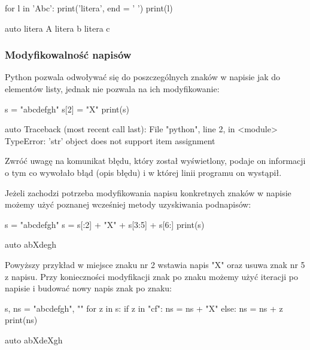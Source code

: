 \documentclass{pdfBooklets}
\begin{document}
\begin{CodeFrame}[python]{0.50\textwidth}
for l in 'Abc':
    print('litera', end = ' ')
    print(l)
\end{CodeFrame}
\begin{CodeFrame}{auto}
litera A
litera b
litera c
\end{CodeFrame}

\subsubsection{Modyfikowalność napisów}

Python pozwala odwoływać się do poszczególnych znaków w napisie jak do elementów listy, jednak nie pozwala na ich modyfikowanie:

\begin{CodeFrame}[python]{0.25\textwidth}
s = "abcdefgh"
s[2] = "X"
print(s)
\end{CodeFrame}
\begin{CodeFrame}{auto}
Traceback (most recent call last):
  File "python", line 2, in <module>
TypeError: 'str' object does not support item assignment
\end{CodeFrame}

Zwróć uwagę na komunikat błędu, który został wyświetlony, podaje on informacji o tym co wywołało błąd (opis błędu) i w  której linii programu on wystąpił.


Jeżeli zachodzi potrzeba modyfikowania napisu konkretnych znaków w napisie możemy użyć poznanej wcześniej metody uzyskiwania podnapisów:

\begin{CodeFrame}[python]{0.50\textwidth}
s = "abcdefgh"
s = s[:2] + "X" + s[3:5] + s[6:]
print(s)
\end{CodeFrame}
\begin{CodeFrame}{auto}
abXdegh
\end{CodeFrame}

Powyższy przykład w miejsce znaku nr 2 wstawia napis "X" oraz usuwa znak nr 5 z napisu.
Przy konieczności modyfikacji znak po znaku możemy użyć iteracji po napisie i budować nowy napis znak po znaku:

\begin{CodeFrame}[python]{0.50\textwidth}
s, ns = "abcdefgh", ""
for z in s:
    if z in "cf":
        ns = ns + "X"
    else:
        ns = ns + z
print(ns)
\end{CodeFrame}
\begin{CodeFrame}{auto}
abXdeXgh
\end{CodeFrame}
\end{document}
